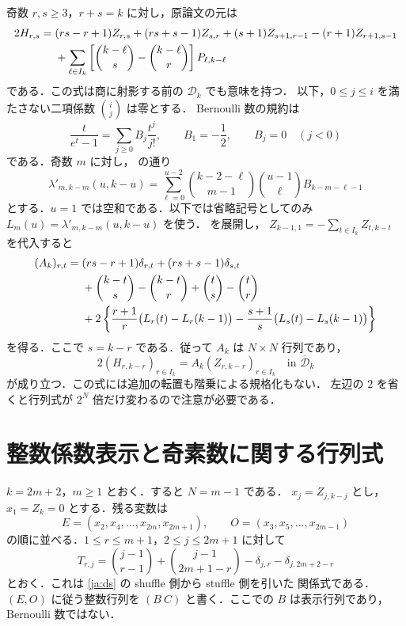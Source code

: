 \documentclass[12pt]{amsart}
\theoremstyle{definition}
\theoremstyle{remark}
\numberwithin{equation}{section}
\newcommand{\Dbar}{\overline{\mathcal D}_k}
\theoremstyle{definition}
\theoremstyle{remark}
\begin{document}
奇数 $r,s\geq3$，$r+s=k$ に対し，原論文の元は
\begin{align}\label{ja:H}
2H_{r,s}={}&(rs-r+1)Z_{r,s}+(rs+s-1)Z_{s,r}
 +(s+1)Z_{s+1,r-1}-(r+1)Z_{r+1,s-1}\notag\\
 &+\sum_{\ell\in I_k}
 \left[\binom{k-\ell}{s}-\binom{k-\ell}{r}\right]P_{\ell,k-\ell}
\end{align}
である．この式は商に射影する前の $\mathcal D_k$ でも意味を持つ．
以下，$0\leq j\leq i$ を満たさない二項係数 $\binom ij$ は零とする．
Bernoulli 数の規約は
\[
 \frac{t}{e^t-1}=\sum_{j\geq0}B_j\frac{t^j}{j!},\qquad
 B_1=-\frac12,\qquad B_j=0\quad(j<0)
\]
である．奇数 $m$ に対し，\cite[(5.28)]{jBR} の通り
\begin{equation}\label{ja:lambda}
 \lambda'_{m,k-m}(u,k-u)=
 \sum_{\ell=0}^{u-2}\binom{k-2-\ell}{m-1}
                   \binom{u-1}{\ell}B_{k-m-\ell-1}
\end{equation}
とする．$u=1$ では空和である．以下では省略記号としてのみ
$L_m(u)=\lambda'_{m,k-m}(u,k-u)$ を使う．
\cite[(5.30)]{jBR} を展開し，
$Z_{k-1,1}=-\sum_{t\in I_k}Z_{t,k-t}$ を代入すると
\begin{align}\label{ja:Aentry}
 (A_k)_{r,t}={}&(rs-r+1)\delta_{r,t}+(rs+s-1)\delta_{s,t}\notag\\
 &+\binom{k-t}{s}-\binom{k-t}{r}
       +\binom{t}{s}-\binom{t}{r}\notag\\
 &+2\left\{\frac{r+1}{r}\bigl(L_r(t)-L_r(k-1)\bigr)
       -\frac{s+1}{s}\bigl(L_s(t)-L_s(k-1)\bigr)\right\}
\end{align}
を得る．ここで $s=k-r$ である．従って $A_k$ は $N\times N$ 行列であり，
\begin{equation}\label{ja:AZ}
 2(H_{r,k-r})_{r\in I_k}=A_k(Z_{r,k-r})_{r\in I_k}
 \quad\text{in }\Dbar
\end{equation}
が成り立つ．この式には追加の転置も階乗による規格化もない．
左辺の $2$ を省くと行列式が $2^N$ 倍だけ変わるので注意が必要である．

\section{整数係数表示と奇素数に関する行列式}
$k=2m+2$，$m\geq1$ とおく．すると $N=m-1$ である．
$x_j=Z_{j,k-j}$ とし，$x_1=Z_k=0$ とする．残る変数は
\[
 E=(x_2,x_4,\ldots,x_{2m},x_{2m+1}),\qquad
 O=(x_3,x_5,\ldots,x_{2m-1})
\]
の順に並べる．$1\leq r\leq m+1$，$2\leq j\leq2m+1$ に対して
\begin{equation}\label{ja:Tentry}
 T_{r,j}=\binom{j-1}{r-1}+\binom{j-1}{2m+1-r}
                -\delta_{j,r}-\delta_{j,2m+2-r}
\end{equation}
とおく．これは \eqref{ja:ds} の shuffle 側から stuffle 側を引いた
関係式である．$(E,O)$ に従う整数行列を $(B\ C)$ と書く．ここでの
$B$ は表示行列であり，Bernoulli 数ではない．
\end{document}
